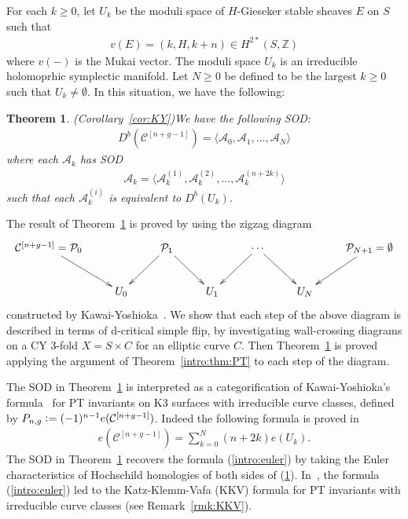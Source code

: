 \documentclass[11pt]{amsart}
\theoremstyle{plain}
\newtheorem{thm}{Theorem}[section]
\newcommand{\aA}{\mathcal{A}}
\newcommand{\cC}{\mathcal{C}}
\newcommand{\pP}{\mathcal{P}}
\begin{document}
 For each $k\ge 0$, let
$U_k$ be the moduli space of $H$-Gieseker stable 
sheaves $E$ 
on $S$ such that
\begin{align*}
v(E)=(k, H, k+n) \in H^{2\ast}(S, \mathbb{Z})
\end{align*}
where $v(-)$ is the Mukai vector. 
The moduli space $U_k$ is an irreducible holomoprhic symplectic manifold. 
Let $N\ge 0$ be defined to be the largest 
$k\ge 0$ such that $U_k \neq \emptyset$. 
In this situation, we have the following: 
\begin{thm}\emph{(Corollary~\ref{cor:KY})}\label{intro:thm2}
We have the following SOD:
\begin{align*}
D^b(\cC^{[n+g-1]})
=\langle \aA_0, \aA_1, \ldots, \aA_N \rangle
\end{align*}
where each $\aA_k$ has SOD
\begin{align*}
\aA_k=\langle 
\aA_k^{(1)}, \aA_k^{(2)}, \ldots, \aA_k^{(n+2k)} \rangle
\end{align*}
such that 
each $\aA_k^{(i)}$ is equivalent to 
$D^b(U_k)$. 
\end{thm}
The result of Theorem~\ref{intro:thm2} is proved by 
using the zigzag diagram
\begin{align*}
\xymatrix{
\cC^{[n+g-1]}=\pP_0
 \ar[rd]  &  & \pP_1 \ar[ld] \ar[rd] & & \ar[ld] \cdots \ar[rd]
 & & \pP_{N+1}=\emptyset \ar[ld] \\
& U_0 &  & U_1 & & U_N &
}
\end{align*}
constructed by Kawai-Yoshioka~\cite{KY}.
We show that each step of the above diagram 
is described in terms of d-critical simple flip, 
by investigating wall-crossing diagrams 
on a CY 3-fold $X=S \times C$ for an 
elliptic curve $C$. 
Then Theorem~\ref{intro:thm2} is proved 
applying 
the argument of Theorem~\ref{intro:thm:PT} 
to each step of the diagram.  

The SOD in Theorem~\ref{intro:thm2}
is interpreted as a categorification of Kawai-Yoshioka's formula~\cite{KY} 
for PT invariants on K3 surfaces with irreducible 
curve classes, defined by $P_{n, g} \cneq (-1)^{n-1}e(\cC^{[n+g-1]})$.
Indeed the following formula 
is proved in~\cite{KY} 
\begin{align}\label{intro:euler}
e(\cC^{[n+g-1]}) =\sum_{k=0}^{N}
(n+2k)e(U_k). 
\end{align}
The SOD in Theorem~\ref{intro:thm2}
recovers the formula (\ref{intro:euler}) by taking 
the Euler characteristics of Hochschild homologies of both sides of (\ref{intro:thm2}). 
In~\cite{KY}, the 
formula (\ref{intro:euler}) led to the 
Katz-Klemm-Vafa (KKV) formula for PT
invariants with irreducible curve classes
(see Remark~\ref{rmk:KKV}). 
\end{document}
